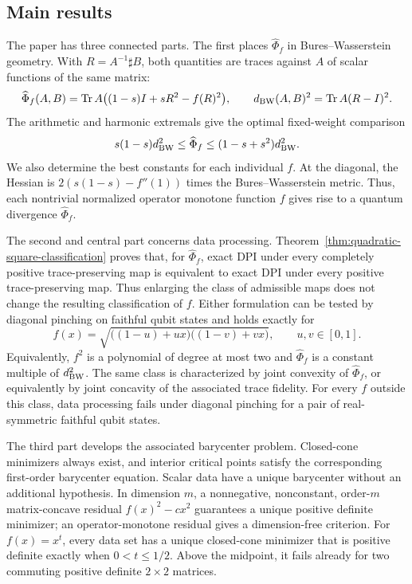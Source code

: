 \documentclass[11pt]{amsart}
\theoremstyle{definition}
\theoremstyle{remark}
\newcommand{\Tr}{\operatorname{Tr}}
\newcommand{\altPhi}{\widehat{\Phi}}
\begin{document}
	\subsection*{Main results}
	The paper has three connected parts.  The first places $\altPhi_f$ in
	Bures--Wasserstein geometry.  With $R=A^{-1}\sharp B$, both quantities are
	traces against $A$ of scalar functions of the same matrix:
	\[
	\altPhi_f(A,B)
	=\Tr A\bigl((1-s)I+sR^2-f(R)^2\bigr),
	\qquad
	d_{\rm BW}(A,B)^2=\Tr A(R-I)^2.
	\]
	The arithmetic and harmonic extremals give the optimal fixed-weight
	comparison
	\[
	s(1-s)d_{\rm BW}^2\le\altPhi_f
	\le(1-s+s^2)d_{\rm BW}^2.
	\]
	We also determine the best constants for each individual $f$.  At the
	diagonal, the Hessian is
	$2(s(1-s)-f''(1))$ times the Bures--Wasserstein metric.  Thus, each nontrivial normalized operator monotone function $f$ gives
	rise to a quantum divergence $\altPhi_f$.
	
The second and central part concerns data processing.
Theorem~\ref{thm:quadratic-square-classification} proves that, for
$\altPhi_f$, exact DPI under every completely positive trace-preserving
map is equivalent to exact DPI under every positive trace-preserving map.
Thus enlarging the class of admissible maps does not change the resulting
classification of $f$.
Either formulation can be tested by diagonal pinching on faithful qubit
states and holds exactly for
\[
f(x)=\sqrt{\bigl((1-u)+ux\bigr)\bigl((1-v)+vx\bigr)},
\qquad u,v\in[0,1].
\]
Equivalently, $f^2$ is a polynomial of degree at most two and
$\altPhi_f$ is a constant multiple of $d_{\rm BW}^2$.  The same class
is characterized by joint convexity of $\altPhi_f$, or equivalently by
joint concavity of the associated trace fidelity.  For every $f$ outside
this class, data processing fails under diagonal pinching for a pair of
real-symmetric faithful qubit states.
	
The third part develops the associated barycenter problem.  Closed-cone
minimizers always exist, and interior critical points satisfy the
corresponding first-order barycenter equation.  Scalar data have a unique barycenter without an additional
	hypothesis.  In dimension $m$, a nonnegative, nonconstant, order-$m$
	matrix-concave residual $f(x)^2-cx^2$ guarantees a unique positive definite
	minimizer; an operator-monotone residual gives a dimension-free criterion.
For $f(x)=x^t$, every data set has a unique closed-cone minimizer that is
positive definite exactly when $0<t\le1/2$.  Above the midpoint, it fails already for two
	commuting positive definite $2\times2$ matrices.
	
\end{document}
